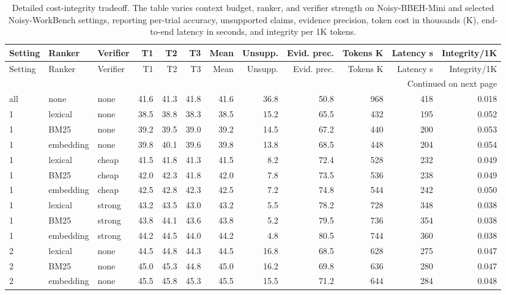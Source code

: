 ﻿\begingroup
\scriptsize
\setlength{\tabcolsep}{2.2pt}
\setlength{\LTleft}{\fill}
\setlength{\LTright}{\fill}
\begin{longtable}{lllrrrrrrrrr}
\caption{Detailed cost-integrity tradeoff. The table varies context budget, ranker, and verifier strength on Noisy-BBEH-Mini and selected Noisy-WorkBench settings, reporting per-trial accuracy, unsupported claims, evidence precision, token cost in thousands (K), end-to-end latency in seconds, and integrity per 1K tokens.}\label{tab:cost-tradeoff-detailed}\\
\toprule
Setting & Ranker & Verifier & T1 & T2 & T3 & Mean & Unsupp. & Evid. prec. & Tokens K & Latency s & Integrity/1K \\
\midrule
\endfirsthead
\toprule
Setting & Ranker & Verifier & T1 & T2 & T3 & Mean & Unsupp. & Evid. prec. & Tokens K & Latency s & Integrity/1K \\
\midrule
\endhead
\midrule
\multicolumn{12}{r}{\scriptsize Continued on next page}\\
\endfoot
\bottomrule
\endlastfoot
all & none & none & 41.6 & 41.3 & 41.8 & 41.6 & 36.8 & 50.8 & 968 & 418 & 0.018 \\
1 & lexical & none & 38.5 & 38.8 & 38.3 & 38.5 & 15.2 & 65.5 & 432 & 195 & 0.052 \\
1 & BM25 & none & 39.2 & 39.5 & 39.0 & 39.2 & 14.5 & 67.2 & 440 & 200 & 0.053 \\
1 & embedding & none & 39.8 & 40.1 & 39.6 & 39.8 & 13.8 & 68.5 & 448 & 204 & 0.054 \\
1 & lexical & cheap & 41.5 & 41.8 & 41.3 & 41.5 & 8.2 & 72.4 & 528 & 232 & 0.049 \\
1 & BM25 & cheap & 42.0 & 42.3 & 41.8 & 42.0 & 7.8 & 73.5 & 536 & 238 & 0.049 \\
1 & embedding & cheap & 42.5 & 42.8 & 42.3 & 42.5 & 7.2 & 74.8 & 544 & 242 & 0.050 \\
1 & lexical & strong & 43.2 & 43.5 & 43.0 & 43.2 & 5.5 & 78.2 & 728 & 348 & 0.038 \\
1 & BM25 & strong & 43.8 & 44.1 & 43.6 & 43.8 & 5.2 & 79.5 & 736 & 354 & 0.038 \\
1 & embedding & strong & 44.2 & 44.5 & 44.0 & 44.2 & 4.8 & 80.5 & 744 & 360 & 0.038 \\
\midrule
2 & lexical & none & 44.5 & 44.8 & 44.3 & 44.5 & 16.8 & 68.5 & 628 & 275 & 0.047 \\
2 & BM25 & none & 45.0 & 45.3 & 44.8 & 45.0 & 16.2 & 69.8 & 636 & 280 & 0.047 \\
2 & embedding & none & 45.5 & 45.8 & 45.3 & 45.5 & 15.5 & 71.2 & 644 & 284 & 0.048 \\

\end{longtable}
